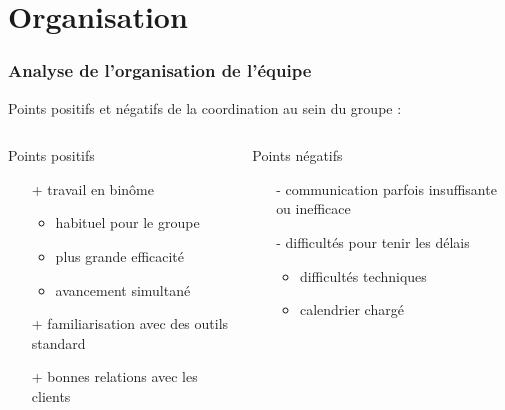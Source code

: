\section{Organisation}

\begin{frame}
\tableofcontents[currentsection]
\end{frame}
\begin{frame}

\frametitle{Analyse de l'organisation de l'équipe}
Points positifs et négatifs de la coordination au sein du groupe :

\bigskip
  \begin{columns}[t]
  \begin{column}{5cm}
  \begin{exampleblock}{Points positifs}
\begin{itemize}
    \item[+] travail en binôme
      \begin{itemize}
      \item habituel pour le groupe
      \item plus grande efficacité
      \item avancement simultané
      \end{itemize}
    \item[+] familiarisation avec des outils standard
    \item[+] bonnes relations avec les clients
  \end{itemize}
  \end{exampleblock} 
  \end{column}
  
  \begin{column}{5cm}
  \begin{alertblock}{Points négatifs}
\begin{itemize}
    \item[-] communication parfois insuffisante ou inefficace
    \item[-] difficultés pour tenir les délais
      \begin{itemize}
      \item difficultés techniques
      \item calendrier chargé
      \end{itemize}
      
    \end{itemize}
  \end{alertblock}   
  \end{column}
  \end{columns}  

\end{frame}

